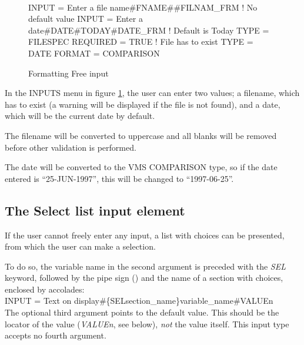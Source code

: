 \documentclass[a4paper]{book}
\renewcommand{\indent}{\hspace*{5mm}}
\begin{document}
\begin{figure}[h!tb]
\begin{minipage}[h!tb]{\textwidth}
\hrulefill \\
\begin{ttfamily}
 \newline
\indent INPUT = Enter a file name{\#}FNAME{\#}{\#}FILNAM{\_}FRM ! No default value \newline
\indent INPUT = Enter a date{\#}DATE{\#}TODAY{\#}DATE{\_}FRM ! Default is Today \newline
 \newline
{} \newline
\indent TYPE = FILESPEC \newline
\indent REQUIRED = TRUE ! File has to exist \newline
 \newline
{} \newline
\indent TYPE = DATE \newline
\indent FORMAT = COMPARISON \newline
\end{ttfamily}
\caption{Formatting Free input}\label{fig:formatfree}
\hrulefill
\end{minipage}
\end{figure}

In the INPUTS menu in figure \ref{fig:formatfree}, the user can enter two values; a filename, which 
has to exist (a warning will be displayed if the file is not found), and a 
date, which will be the current date by default.

The filename will be converted to uppercase and all blanks will be removed 
before other validation is performed.

The date will be converted to the VMS COMPARISON type, so if the date 
entered is ``25-JUN-1997'', this will be changed to ``1997-06-25''.

\subsection{The Select list input element}
\label{subsubsec:mylabel39}

If the user cannot freely enter any input, a list with choices can be 
presented, from which the user can make a selection.

To do so, the variable name in the second argument is preceded with the \textsl{SEL} 
keyword, followed by the pipe sign (\textsl{\textbar}) and the name of a section 
with choices, enclosed by accolades: \\
\indent\textsf{INPUT = Text on display{\#}{\{}SEL\textbar section{\_}name{\}}variable{\_}name{\#}VALUEn} \\
The optional third argument points to the default value. This should be the 
locator of the value (\textsl{VALUE\textit{n}}, see below), \textit{not} the value itself. This input type 
accepts no fourth argument.
\end{document}
